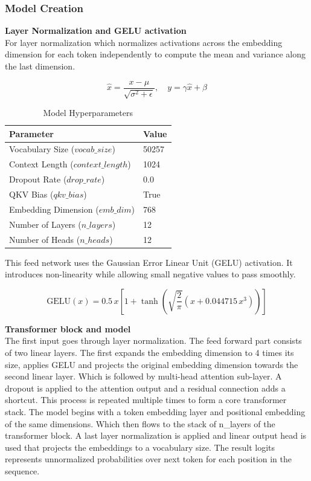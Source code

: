 \subsubsection{Model Creation}
\textbf{Layer Normalization and GELU activation}\\
For layer normalization which normalizes activations across the embedding dimension for each token independently to compute the mean and variance along the last dimension.

\begin{equation}
\hat{x} = \frac{x - \mu}{\sqrt{\sigma^2 + \epsilon}}, \quad
y = \gamma \hat{x} + \beta
\end{equation}


\begin{table}[ht]
\caption{Model Hyperparameters}
\centering
\begin{tabular}{|l|l|}
\hline
\textbf{Parameter} & \textbf{Value} \\
\hline
Vocabulary Size ($vocab\_size$) & 50257 \\
Context Length ($context\_length$) & 1024 \\
Dropout Rate ($drop\_rate$) & 0.0 \\
QKV Bias ($qkv\_bias$) & True \\
Embedding Dimension ($emb\_dim$) & 768 \\
Number of Layers ($n\_layers$) & 12 \\
Number of Heads ($n\_heads$) & 12 \\
\hline
\end{tabular}
\end{table}

This feed network uses the Gaussian Error Linear Unit (GELU) activation. It introduces non-linearity while allowing small negative values to pass smoothly.

\begin{equation}
\mathrm{GELU}(x) = 0.5 \, x \left[ 1 + \tanh \left( \sqrt{\frac{2}{\pi}} \left( x + 0.044715 \, x^3 \right) \right) \right]
\end{equation}

\textbf{Transformer block and model}\\
The first input goes through layer normalization. The feed forward part consists of two linear layers. The first expands the embedding dimension to 4 times its size, applies GELU and projects the original embedding dimension towards the second linear layer. Which is followed by multi-head attention sub-layer. A dropout is applied to the attention output and a residual connection adds a shortcut. This process is repeated multiple times to form a core transformer stack. The model begins with a token embedding layer and positional embedding of the same dimensions. Which then flows to the stack of n\_layers of the transformer block. A last layer normalization is applied and linear output head is used that projects the embeddings to a vocabulary size. The result logits represents unnormalized probabilities over next token for each position in the sequence.

